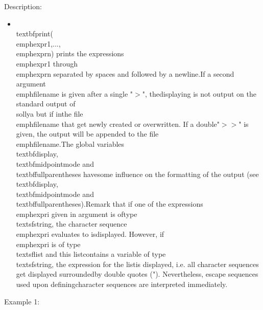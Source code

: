 \noindent Description: \begin{itemize}

\item \\textbf{print}(\\emph{expr1},...,\\emph{exprn}) prints the expressions \\emph{expr1} through\n   \\emph{exprn} separated by spaces and followed by a newline.\n    \n   If a second argument \\emph{filename} is given after a single  "$>$", the\n   displaying is not output on the standard output of \\sollya but if in\n   the file \\emph{filename} that get newly created or overwritten. If a double\n    "$>>$" is given, the output will be appended to the file \\emph{filename}.\n    \n   The global variables \\textbf{display}, \\textbf{midpointmode} and \\textbf{fullparentheses} have\n   some influence on the formatting of the output (see \\textbf{display},\n   \\textbf{midpointmode} and \\textbf{fullparentheses}).\n    \n   Remark that if one of the expressions \\emph{expri} given in argument is of\n   type \\textsf{string}, the character sequence \\emph{expri} evaluates to is\n   displayed. However, if \\emph{expri} is of type \\textsf{list} and this list\n   contains a variable of type \\textsf{string}, the expression for the list\n   is displayed, i.e.  all character sequences get displayed surrounded\n   by double quotes ("). Nevertheless, escape sequences used upon defining\n   character sequences are interpreted immediately.\n\end{itemize}
\noindent Example 1: 
\begin{center}\begin{minipage}{15cm}\begin{Verbatim}[frame=single]
\end{Verbatim}
\end{minipage}\end{center}
